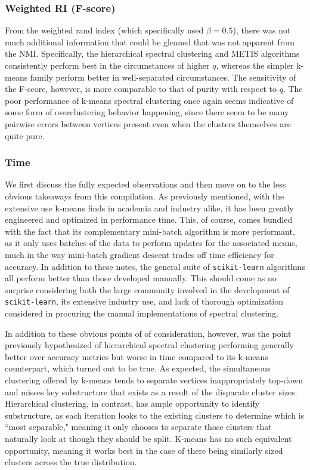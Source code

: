 \documentclass{article}
\begin{document}
\subsubsection{Weighted RI (F-score)}
From the weighted rand index (which specifically used $\beta=0.5$), there was not much additional information that could be gleaned that was not apparent from the NMI. Specifically, the hierarchical spectral clustering and METIS algorithms consistently perform best in the circumstances of higher $q$, whereas the simpler k-means family perform better in well-separated circumstances. The sensitivity of the F-score, however, is more comparable to that of purity with respect to $q$. The poor performance of k-means spectral clustering once again seems indicative of some form of overclustering behavior happening, since there seem to be many pairwise errors between vertices present even when the clusters themselves are quite pure.

\subsubsection{Time}
We first discuss the fully expected observations and then move on to the less obvious takeaways from this compilation. As previously mentioned, with the extensive use k-means finds in academia and industry alike, it has been greatly engineered and optimized in performance time. This, of course, comes bundled with the fact that its complementary mini-batch algorithm is more performant, as it only uses batches of the data to perform updates for the associated means, much in the way mini-batch gradient descent trades off time efficiency for accuracy. In addition to these notes, the general suite of \texttt{scikit-learn} algorithms all perform better than those developed manually. This should come as no surprise considering both the large community involved in the development of \texttt{scikit-learn}, its extensive industry use, and lack of thorough optimization considered in procuring the manual implementations of spectral clustering.

In addition to these obvious points of of consideration, however, was the point previously hypothesized of hierarchical spectral clustering performing generally better over accuracy metrics but worse in time compared to its k-means counterpart, which turned out to be true. As expected, the simultaneous clustering offered by k-means tends to separate vertices inappropriately top-down and misses key substructure that exists as a result of the disparate cluster sizes. Hierarchical clustering, in contrast, has ample opportunity to identify substructure, as each iteration looks to the existing clusters to determine which is ``most separable," meaning it only chooses to separate those clusters that naturally look at though they should be split. K-means has no such equivalent opportunity, meaning it works best in the case of there being similarly sized clusters across the true distribution. 
\end{document}
